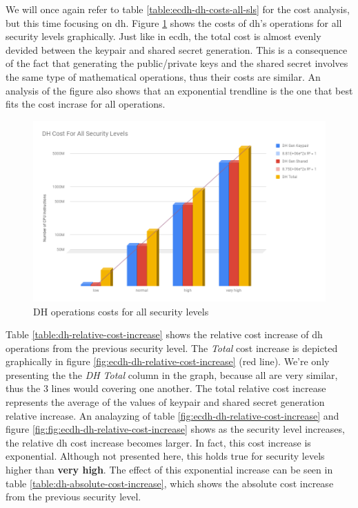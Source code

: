 \documentclass{llncs}
\begin{document}
We will once again refer to table \ref{table:ecdh-dh-costs-all-sls} for the cost analysis, but this time focusing on \gls{dh}. Figure
\ref{fig:dh-costs-all-sls} shows the costs of \gls{dh}'s operations for all security levels graphically. Just like in \gls{ecdh}, the total cost
is almost evenly devided between the keypair and shared secret generation. This is a consequence of the fact that generating the public/private keys
and the shared secret involves the same type of mathematical operations, thus their costs are similar. An analysis of the figure
also shows that an exponential trendline is the one that best fits the cost incrase for all operations.

  \begin{figure}
    \centering
    \includegraphics[width=1.0\textwidth]{img/dh_costs_all_sls.png}
    \centering \caption{\label{fig:dh-costs-all-sls} DH operations costs for all security levels}
  \end{figure}

Table \ref{table:dh-relative-cost-increase} shows the relative cost increase of \gls{dh} operations from the previous security level. The \textit{Total} 
cost increase is depicted graphically in figure \ref{fig:ecdh-dh-relative-cost-increase} (red line). We're only presenting the the \textit{DH Total} column 
in the graph, because all are very similar, thus the $3$ lines would covering one another. The total relative cost increase represents the average of the 
values of keypair and shared secret generation relative increase. An analayzing of table \ref{fig:ecdh-dh-relative-cost-increase} and figure
\ref{fig:fig:ecdh-dh-relative-cost-increase} shows as the security level increases, the relative \gls{dh} cost increase becomes larger. In fact,
this cost increase is exponential. Although not presented here, this holds true for security levels higher than \textbf{very high}. 
The effect of this exponential increase can be seen in table \ref{table:dh-absolute-cost-increase}, which shows the absolute cost increase from 
the previous security level.
\end{document}

